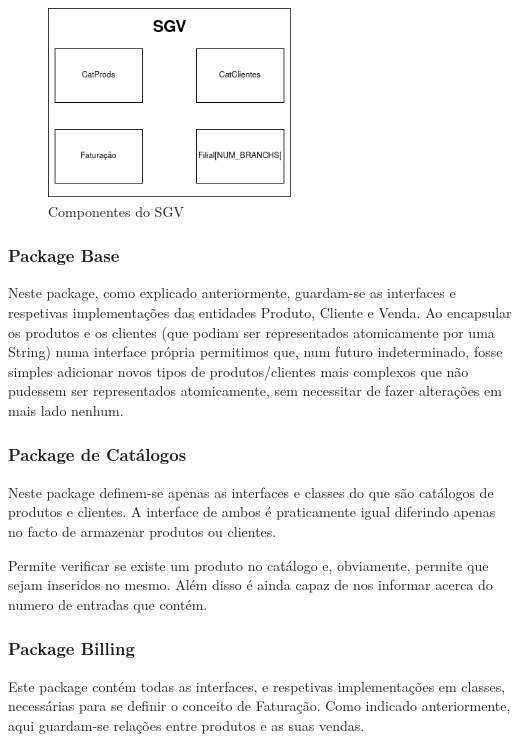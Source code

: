 \documentclass[11pt]{article}
\begin{document}
\vspace{1cm}
\begin{figure}[h]
    \centering
    \includegraphics[width=\textwidth,height=5cm]{images/sgv.png}
    \caption{Componentes do SGV}
\end{figure}

\newpage
\subsubsection{Package Base}
Neste package, como explicado anteriormente, guardam-se as interfaces e respetivas implementações das entidades Produto, Cliente e Venda.
Ao encapsular os produtos e os clientes (que podiam ser representados atomicamente por uma String) numa interface própria permitimos que, num futuro indeterminado, fosse simples adicionar novos tipos de produtos/clientes mais complexos que não pudessem ser representados atomicamente, sem necessitar de fazer alterações em mais lado nenhum.

\subsubsection{Package de Catálogos}
Neste package definem-se apenas as interfaces e classes do que são catálogos de produtos e clientes. A interface de ambos é praticamente igual diferindo apenas no facto de armazenar produtos ou clientes.

Permite verificar se existe um produto no catálogo e, obviamente, permite que sejam inseridos no mesmo. Além disso é ainda capaz de nos informar acerca do numero de entradas que contém.  
\subsubsection{Package Billing}
Este package contém todas as interfaces, e respetivas implementações em classes, necessárias para se definir o conceito de Faturação. Como indicado anteriormente, aqui guardam-se relações entre produtos e as suas vendas.
\end{document}
